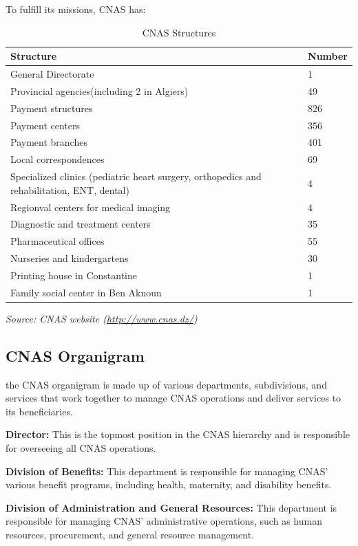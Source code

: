\medskip To fulfill its missions, CNAS has: 
\begin{table}[htbp]
  \centering
  \begin{tabular}{|p{10cm}|l|}
  \hline
  \textbf{Structure} & \textbf{Number} \\
  \hline
  General Directorate & 1 \\
  \hline
  Provincial agencies(including 2 in Algiers)  & 49 \\
  \hline
  Payment structures & 826 \\
  \hline
  Payment centers & 356 \\
  \hline
  Payment branches & 401 \\
  \hline
  Local correspondences & 69 \\
  \hline
  Specialized clinics (pediatric heart surgery, orthopedics and rehabilitation, ENT, dental) & 4 \\
  \hline
  Regionval centers for medical imaging & 4 \\
  \hline
  Diagnostic and treatment centers & 35 \\
  \hline
  Pharmaceutical offices & 55 \\
  \hline
  Nurseries and kindergartens & 30 \\
  \hline
  Printing house in Constantine & 1 \\
  \hline
  Family social center in Ben Aknoun & 1 \\
  \hline
  \end{tabular}
  \caption{CNAS Structures}
  \end{table}

\textit{Source: CNAS website (\url{http://www.cnas.dz/})}
\newpage
\subsection{CNAS Organigram}
the CNAS organigram is made up of various departments, subdivisions, and services that work together to manage CNAS operations and deliver services to its beneficiaries.

\medskip \textbf{Director:} This is the topmost position in the CNAS hierarchy and is responsible for overseeing all CNAS operations.

\textbf{Division of Benefits:} This department is responsible for managing CNAS' various benefit programs, including health, maternity, and disability benefits.

\textbf{Division of Administration and General Resources:} This department is responsible for managing CNAS' administrative operations, such as human resources, procurement, and general resource management.

